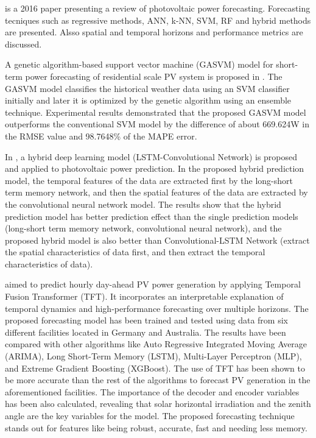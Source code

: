 \cite{ANTONANZAS201678} is a 2016 paper presenting a review of photovoltaic power forecasting.
Forecasting tecniques such as regressive methods, ANN, k-NN, SVM, RF and hybrid methods are presented.
Alsso spatial and temporal horizons and performance metrics are discussed.

A genetic algorithm-based support vector machine (GASVM) model for short-term power forecasting of residential scale PV system is proposed in \cite{VANDEVENTER2019367}.
The GASVM model classifies the historical weather data using an SVM classifier initially and later it is optimized by the genetic algorithm using an ensemble technique.
Experimental results demonstrated that the proposed GASVM model outperforms the conventional SVM model by the difference of about 669.624W in the RMSE value and 98.7648\% of the MAPE error.

In \cite{WANG2019116225}, a hybrid deep learning model (LSTM-Convolutional Network) is proposed and applied to photovoltaic power prediction.
In the proposed hybrid prediction model, the temporal features of the data are extracted first by the long-short term memory network, and then the spatial features of the data are extracted by the convolutional neural network model.
The results show that the hybrid prediction model has better prediction effect than the single prediction models (long-short term memory network, convolutional neural network), and the proposed hybrid model is also better than Convolutional-LSTM Network (extract the spatial characteristics of data first, and then extract the temporal characteristics of data).

\cite{en15145232}  aimed to predict hourly day-ahead PV power generation by applying Temporal Fusion Transformer (TFT).
It incorporates an interpretable explanation of temporal dynamics and high-performance forecasting over multiple horizons.
The proposed forecasting model has been trained and tested using data from six different facilities located in Germany and Australia.
The results have been compared with other algorithms like Auto Regressive Integrated Moving Average (ARIMA), Long Short-Term Memory (LSTM), Multi-Layer Perceptron (MLP), and Extreme Gradient Boosting (XGBoost).
The use of TFT has been shown to be more accurate than the rest of the algorithms to forecast PV generation in the aforementioned facilities.
The importance of the decoder and encoder variables has been also calculated, revealing that solar horizontal irradiation and the zenith angle are the key variables for the model.
The proposed forecasting technique stands out for features like being robust, accurate, fast and needing less memory.
